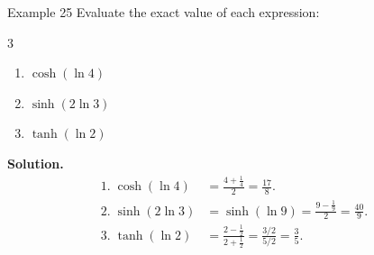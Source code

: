 \begin{examplebox}{Example 25}
Evaluate the exact value of each expression:
\begin{multicols}{3}
\begin{enumerate}
    \item \(\cosh(\ln 4)\)
    \item \(\sinh(2\ln 3)\)
    \item \(\tanh(\ln 2)\)
\end{enumerate}
\end{multicols}

\medskip
\textbf{Solution.}
\begin{align*}
1.\; \cosh(\ln 4) &= \frac{4 + \frac{1}{4}}{2} = \frac{17}{8}. \\[4pt]
2.\; \sinh(2\ln 3) &= \sinh(\ln 9) = \frac{9 - \frac{1}{9}}{2} = \frac{40}{9}. \\[4pt]
3.\; \tanh(\ln 2) &= \frac{2 - \frac{1}{2}}{2 + \frac{1}{2}} = \frac{3/2}{5/2} = \frac{3}{5}.
\end{align*}
\end{examplebox}

